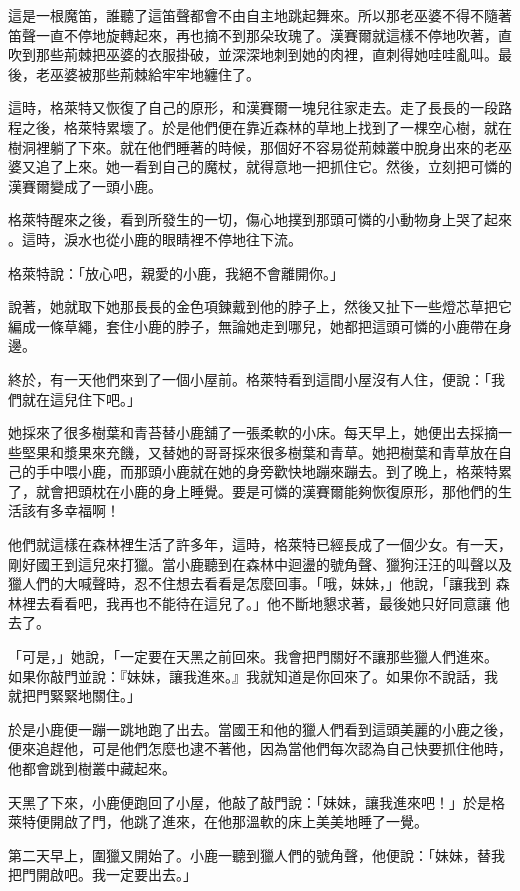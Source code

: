 \documentclass[oneside,11pt]{memoir} %
\begin{document}
這是一根魔笛，誰聽了這笛聲都會不由自主地跳起舞來。所以那老巫婆不得不隨著
笛聲一直不停地旋轉起來，再也摘不到那朵玫瑰了。漢賽爾就這樣不停地吹著，直
吹到那些荊棘把巫婆的衣服掛破，並深深地刺到她的肉裡，直刺得她哇哇亂叫。最
後，老巫婆被那些荊棘給牢牢地纏住了。

這時，格萊特又恢復了自己的原形，和漢賽爾一塊兒往家走去。走了長長的一段路
程之後，格萊特累壞了。於是他們便在靠近森林的草地上找到了一棵空心樹，就在
樹洞裡躺了下來。就在他們睡著的時候，那個好不容易從荊棘叢中脫身出來的老巫
婆又追了上來。她一看到自己的魔杖，就得意地一把抓住它。然後，立刻把可憐的
漢賽爾變成了一頭小鹿。

格萊特醒來之後，看到所發生的一切，傷心地撲到那頭可憐的小動物身上哭了起來
。這時，淚水也從小鹿的眼睛裡不停地往下流。

格萊特說：「放心吧，親愛的小鹿，我絕不會離開你。」

說著，她就取下她那長長的金色項鍊戴到他的脖子上，然後又扯下一些燈芯草把它
編成一條草繩，套住小鹿的脖子，無論她走到哪兒，她都把這頭可憐的小鹿帶在身
邊。

終於，有一天他們來到了一個小屋前。格萊特看到這間小屋沒有人住，便說：「我
們就在這兒住下吧。」

她採來了很多樹葉和青苔替小鹿舖了一張柔軟的小床。每天早上，她便出去採摘一
些堅果和漿果來充饑，又替她的哥哥採來很多樹葉和青草。她把樹葉和青草放在自
己的手中喂小鹿，而那頭小鹿就在她的身旁歡快地蹦來蹦去。到了晚上，格萊特累
了，就會把頭枕在小鹿的身上睡覺。要是可憐的漢賽爾能夠恢復原形，那他們的生
活該有多幸福啊！

他們就這樣在森林裡生活了許多年，這時，格萊特已經長成了一個少女。有一天，
剛好國王到這兒來打獵。當小鹿聽到在森林中迴盪的號角聲、獵狗汪汪的叫聲以及
獵人們的大喊聲時，忍不住想去看看是怎麼回事。「哦，妹妹，」他說，「讓我到
森林裡去看看吧，我再也不能待在這兒了。」他不斷地懇求著，最後她只好同意讓
他去了。

「可是，」她說，「一定要在天黑之前回來。我會把門關好不讓那些獵人們進來。
如果你敲門並說：『妹妹，讓我進來。』我就知道是你回來了。如果你不說話，我
就把門緊緊地關住。」

於是小鹿便一蹦一跳地跑了出去。當國王和他的獵人們看到這頭美麗的小鹿之後，
便來追趕他，可是他們怎麼也逮不著他，因為當他們每次認為自己快要抓住他時，
他都會跳到樹叢中藏起來。

天黑了下來，小鹿便跑回了小屋，他敲了敲門說：「妹妹，讓我進來吧！」於是格
萊特便開啟了門，他跳了進來，在他那溫軟的床上美美地睡了一覺。

第二天早上，圍獵又開始了。小鹿一聽到獵人們的號角聲，他便說：「妹妹，替我
把門開啟吧。我一定要出去。」
\end{document}
